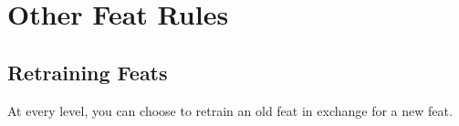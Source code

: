 \section{Other Feat Rules}

    \subsection{Retraining Feats}
        At every level, you can choose to retrain an old feat in exchange for a new feat.
